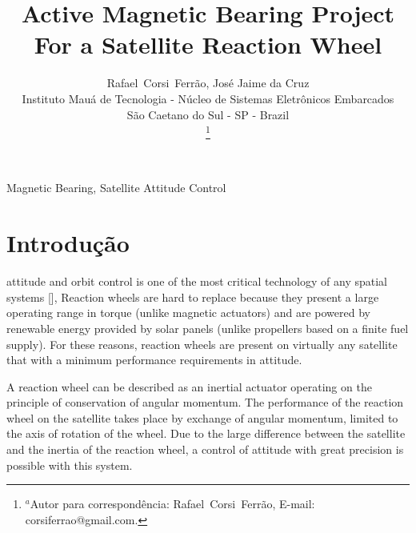 \documentclass[journal,a4paper,oneside,twocolumn]{IEEEtran}
\begin{document}
%
\title{Active Magnetic Bearing Project For a Satellite Reaction Wheel }

\author{
		Rafael~Corsi~Ferr\~{a}o, Jos\'{e} Jaime da Cruz
        \\%
        Instituto Mau\'{a} de Tecnologia -  N\'{u}cleo de Sistemas Eletr\^{o}nicos Embarcados \\
        S\~{a}o Caetano do Sul - SP - Brazil 
        
\thanks{ $^{a}$Autor para correspondência: Rafael~Corsi~Ferr\~{a}o, E-mail: corsiferrao@gmail.com.}%
}




\maketitle


\begin{abstract}

\end{abstract}

\begin{IEEEkeywords}
	Magnetic Bearing, Satellite Attitude Control 
\end{IEEEkeywords}


\IEEEpeerreviewmaketitle

\section{Introdução}

 attitude and orbit control is one of the most critical technology of any spatial systems [], Reaction wheels are hard to replace because they present a large operating range in torque (unlike magnetic actuators) and are powered by renewable energy provided by solar panels (unlike propellers based on a finite fuel supply). For these reasons, reaction wheels are present on virtually any satellite that with a  minimum performance requirements in attitude.

A reaction wheel can be described as an inertial actuator operating on the principle of conservation of angular momentum. The performance of the reaction wheel on the satellite takes place by exchange of angular momentum, limited to the axis of rotation of the wheel. Due to the large difference between the satellite and the inertia of the reaction wheel, a control of attitude with great precision is possible with this system.
\end{document}

